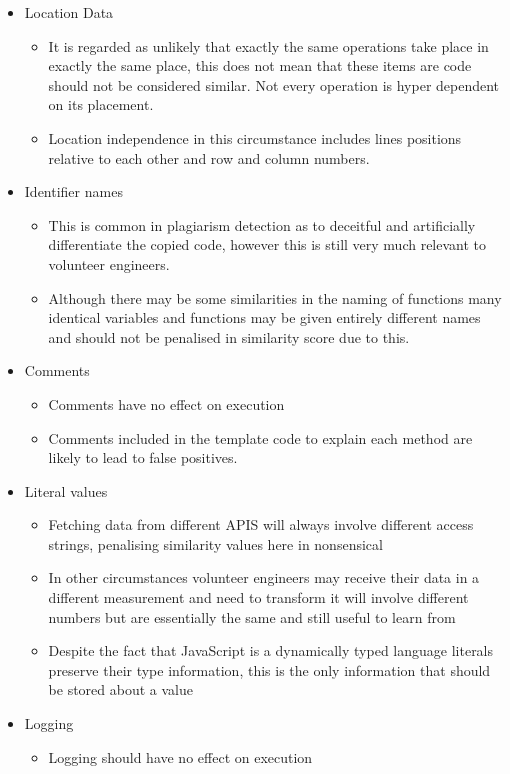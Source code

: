 \documentclass[jou,apacite]{apa6}
\begin{document}
\begin{itemize}
  \setlength\itemsep{-0.5em}
  \item Location Data
  	\begin{itemize}
  		\setlength\itemsep{-0.2em}
		\item It is regarded as unlikely that exactly the same operations take place in exactly the same place, this does not mean that these items are code should not be considered similar. Not every operation is hyper dependent on its placement.
		\item Location independence in this circumstance includes lines positions relative to each other and row and column numbers.

	\end{itemize}
  \item Identifier names
  \begin{itemize}
  		\setlength\itemsep{-0.2em}
		\item This is common in plagiarism detection as to deceitful and artificially differentiate the copied code, however this is still very much relevant to volunteer engineers.
		\item Although there may be some similarities in the naming of functions many identical variables and functions may be given entirely different names and should not be penalised in similarity score due to this.
	\end{itemize}
  \item Comments
  	\begin{itemize}
  		\setlength\itemsep{-0.2em}
		\item Comments have no effect on execution 
		\item Comments included in the template code to explain each method are likely to lead to false positives.
	\end{itemize}
  \item Literal values
  	\begin{itemize}
  		\setlength\itemsep{-0.2em}
		\item Fetching data from different APIS will always involve different access strings, penalising similarity values here in nonsensical 
		\item In other circumstances volunteer engineers may receive their data in a different measurement and need to transform it will involve different numbers but are essentially the same and still useful to learn from
		\item Despite the fact that JavaScript is a dynamically typed language literals preserve their type information, this is the only information that should be stored about a value
	\end{itemize}
	\item Logging
	\begin{itemize}
  		\setlength\itemsep{-0.2em}
		\item Logging should have no effect on execution
	\end{itemize}
\end{itemize}
\end{document}

